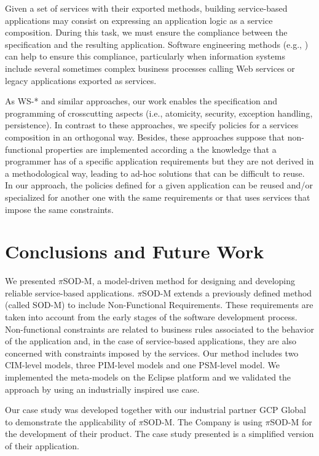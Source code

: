 \documentclass{singlecol-new}
\theoremstyle{TH}{
\newtheorem{lemma}{Lemma}
\newtheorem{theorem}[lemma]{Theorem}
\newtheorem{corrolary}[lemma]{Corrolary}
\newtheorem{conjecture}[lemma]{Conjecture}
\newtheorem{proposition}[lemma]{Proposition}
\newtheorem{claim}[lemma]{Claim}
\newtheorem{stheorem}[lemma]{Wrong Theorem}
\newtheorem{algorithm}{Algorithm}
}
\theoremstyle{THrm}{
\newtheorem{definition}{Definition}[section]
\newtheorem{question}{Question}[section]
\newtheorem{remark}{Remark}
\newtheorem{scheme}{Scheme}
}
\theoremstyle{THhit}{
\newtheorem{case}{Case}[section]
}
\theoremstyle{THhsl}{
\newtheorem{example}{Example}
}
\newcommand{\pisodm}[0]{$\pi$SOD-M\xspace}
\begin{document}
Given a set of services with their exported methods, building service-based applications may consist on expressing an application logic as a service composition.
During this task, we must ensure the compliance between the specification and the resulting application.
Software engineering methods (e.g., \cite{2,decastro1,PapazoglouH06}) can help to ensure this compliance, particularly when information systems include several sometimes complex business processes calling Web services or legacy applications exported as services.

As WS-* and similar approaches, our work enables the specification and programming of crosscutting aspects (i.e., atomicity, security, exception handling, persistence).
In contrast to these approaches, we specify policies for a services composition in an orthogonal way. Besides, these approaches suppose that non-functional properties are implemented according a the knowledge that a programmer has of a specific application requirements but they are not derived in a methodological way, leading to ad-hoc solutions that can be difficult to reuse. In our approach,  the policies defined for a given application  can be reused and/or specialized for another one with the same requirements or that uses services that impose the same constraints. 


\section{Conclusions and Future Work}\label{sec:conclusions}
We presented \pisodm, a model-driven method for designing and developing reliable service-based applications.
\pisodm extends a previously defined method (called SOD-M) to include Non-Functional Requirements.
These requirements are taken into account from the early stages of the software development process.
Non-functional constraints are related to business rules associated to the behavior of the application and, in the case of service-based applications, they are also concerned with constraints imposed by the services.
Our method includes two CIM-level models, three PIM-level models and one PSM-level model.
We implemented the meta-models on the Eclipse platform and we validated the approach by using an industrially inspired use case.

Our case study was developed together with our industrial partner GCP Global to demonstrate the applicability of \pisodm.
The Company is using \pisodm for the development of their product.
The case study presented is a simplified version of their application. 



\end{document}
